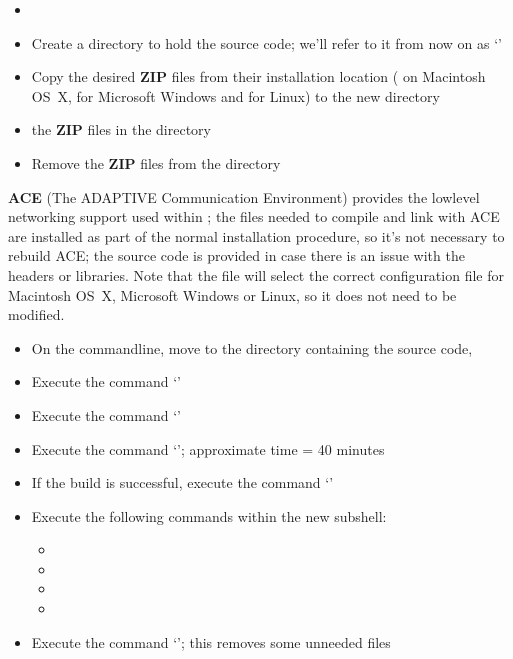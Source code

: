 \tertiaryEnd{}
\begin{itemize}
\item\TBD{}
\end{itemize}
\tertiaryEnd{}
\secondaryEnd{}
\begin{itemize}
\item Create a directory to hold the source code; we'll refer to it from now on as
`'
\item\exSp{} Copy the desired \textbf{ZIP} files from their installation location
( on Macintosh OS~X, \TBD{} for Microsoft Windows and \TBD{} for
Linux) to the new directory 
\item\exSp{} the \textbf{ZIP} files in the directory 
\item\exSp{} Remove the \textbf{ZIP} files from the  directory
\end{itemize}
\secondaryEnd{}
\textbf{ACE} (The ADAPTIVE Communication Environment) provides the low\longDash{}level
networking support used within \mplusm{}; the files needed to compile and link with ACE
are installed as part of the normal \mplusm{} installation procedure, so it's not
necessary to rebuild ACE; the source code is provided in case there is an issue with the
headers or libraries.
Note that the file  will select the correct
configuration file for Macintosh OS~X, Microsoft Windows or Linux, so it does not need to
be modified.
\begin{itemize}
\item On the command\longDash{}line, move to the directory containing the \mplusm{} source
code, 
\item\exSp{} Execute the command `'
\item\exSp{} Execute the command `'
\item\exSp{} Execute the command `'; approximate time = 40
minutes
\item\exSp{} If the build is successful, execute the command `'
\item\exSp{} Execute the following commands within the new subshell:
\begin{itemize}
\item{}
\item\exSp{}
\item\exSp{}
\item\exSp{}
\end{itemize}
\item\exSp{} Execute the command `'; this removes some
unneeded files
\end{itemize}
